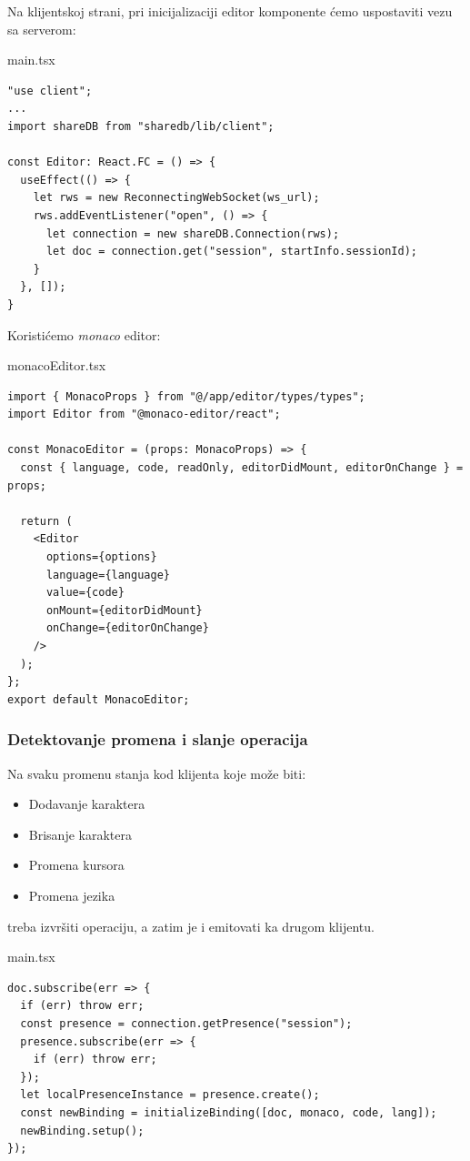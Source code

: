 \documentclass[12pt]{article}
\begin{document}
Na klijentskoj strani, pri inicijalizaciji editor komponente ćemo uspostaviti vezu sa serverom:

\begin{mylisting}[label={lst:example}]{main.tsx}
\begin{lstlisting}
"use client";
...
import shareDB from "sharedb/lib/client";

const Editor: React.FC = () => {
  useEffect(() => {
    let rws = new ReconnectingWebSocket(ws_url);
    rws.addEventListener("open", () => {
      let connection = new shareDB.Connection(rws);
      let doc = connection.get("session", startInfo.sessionId);
    }
  }, []);
}
\end{lstlisting}
\end{mylisting}

Koristićemo \textit{monaco} editor:

\begin{mylisting}[label={lst:example}]{monacoEditor.tsx}
\begin{lstlisting}
import { MonacoProps } from "@/app/editor/types/types";
import Editor from "@monaco-editor/react";

const MonacoEditor = (props: MonacoProps) => {
  const { language, code, readOnly, editorDidMount, editorOnChange } = props;

  return (
    <Editor
      options={options}
      language={language}
      value={code}
      onMount={editorDidMount}
      onChange={editorOnChange}
    />
  );
};
export default MonacoEditor;
\end{lstlisting}
\end{mylisting}

\subsubsection{Detektovanje promena i slanje operacija}

Na svaku promenu stanja kod klijenta koje može biti:

\begin{itemize}
    \item Dodavanje karaktera
    \item Brisanje karaktera
    \item Promena kursora
    \item Promena jezika
\end{itemize}

treba izvršiti operaciju, a zatim je i emitovati ka drugom klijentu.


\begin{mylisting}[label={lst:example}]{main.tsx}
\begin{lstlisting}
doc.subscribe(err => {
  if (err) throw err;
  const presence = connection.getPresence("session");
  presence.subscribe(err => {
    if (err) throw err;
  });
  let localPresenceInstance = presence.create();
  const newBinding = initializeBinding([doc, monaco, code, lang]);
  newBinding.setup();
});
\end{lstlisting}
\end{mylisting}
\end{document}
